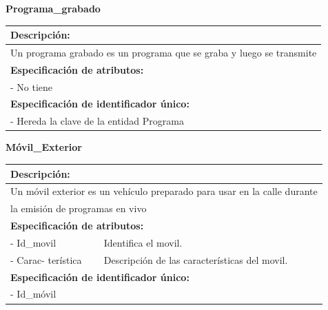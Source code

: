 \documentclass[a4paper,10pt]{article}
\begin{document}
    \begin{flushleft}
      \begin{large} \bf{Programa\_grabado} \end{large}
    \end{flushleft}
      \begin{tabular}{| p{2cm} | p{9cm} |}
	\hline
	\multicolumn{2}{|l|}{\bf{Descripci\'on:}} \\
	\hline
	\multicolumn{2}{|l|}{Un programa grabado es un programa que se graba y luego se transmite} \\
	\hline	
	\multicolumn{2}{|l|}{\bf{Especificaci\'on de atributos:}} \\
	\hline
	- No tiene & \\
	\hline
	\multicolumn{2}{|l|}{\bf{Especificaci\'on de identificador \'unico:}} \\
	\hline
	\multicolumn{2}{|l|}{- Hereda la clave de la entidad Programa} \\
	\hline
      \end{tabular}

    \newpage
    \begin{flushleft}
      \begin{large} \bf{M\'ovil\_Exterior} \end{large}
    \end{flushleft}
      \begin{tabular}{| p{2cm} | p{9cm} |}
	\hline
	\multicolumn{2}{|l|}{\bf{Descripci\'on:}} \\
	\hline
	\multicolumn{2}{|l|}{Un m\'ovil exterior es un veh\'iculo preparado para usar en la calle durante} \\
	\multicolumn{2}{|l|}{la emisi\'on de programas en vivo} \\	
	\hline	
	\multicolumn{2}{|l|}{\bf{Especificaci\'on de atributos:}} \\
	\hline
	- Id\_movil & Identifica el movil. \\
	\hline \hline
	- Carac- \newline ter\'istica & Descripci\'on de las caracter\'isticas del movil. \\
	\hline
	\multicolumn{2}{|l|}{\bf{Especificaci\'on de identificador \'unico:}} \\
	\hline
	\multicolumn{2}{|l|}{- Id\_m\'ovil} \\
	\hline
      \end{tabular}
      
\end{document}
